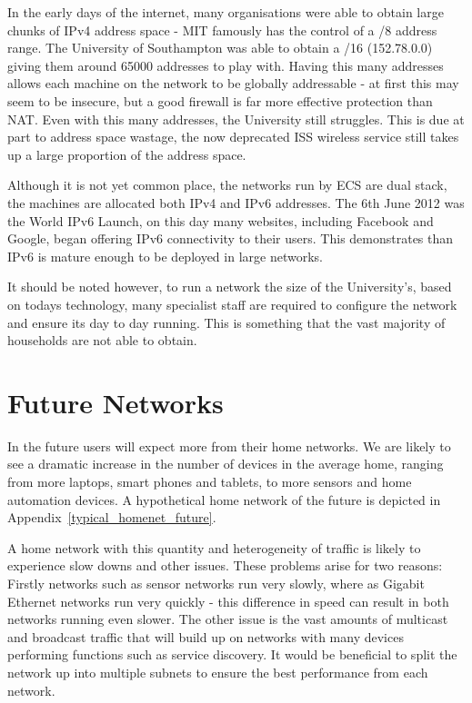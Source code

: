 \documentclass[12pt]{report}
\begin{document}
In the early days of the internet, many organisations were able to obtain large
chunks of IPv4 address space - MIT famously has the control of a /8 address
range. The University of Southampton was able to obtain a /16 (152.78.0.0)
giving them around 65000 addresses to play with. Having this many addresses
allows each machine on the network to be globally addressable - at first this
may seem to be insecure, but a good firewall is far more effective protection
than NAT\@. Even with this many addresses, the University still struggles. This
is due at part to address space wastage, the now deprecated ISS wireless
service still takes up a large proportion of the address space.

Although it is not yet common place, the networks run by ECS are dual stack,
the machines are allocated both IPv4 and IPv6 addresses. The 6th June 2012 was
the World IPv6 Launch, on this day many websites, including Facebook and
Google, began offering IPv6 connectivity to their users. This demonstrates than
IPv6 is mature enough to be deployed in large networks.

It should be noted however, to run a network the size of the University's,
based on todays technology, many specialist staff are required to configure the
network and ensure its day to day running. This is something that the vast
majority of households are not able to obtain.

\section{Future Networks}
In the future users will expect more from their home networks. We are likely to
see a dramatic increase in the number of devices in the average home, ranging
from more laptops, smart phones and tablets, to more sensors and home automation
devices. A hypothetical home network of the future is depicted in
Appendix~\ref{typical_homenet_future}.

A home network with this quantity and heterogeneity of traffic is likely to
experience slow downs and other issues. These problems arise for two reasons:
Firstly networks such as sensor networks run very slowly, where as Gigabit
Ethernet networks run very quickly - this difference in speed can result in
both networks running even slower. The other issue is the vast amounts of
multicast and broadcast traffic that will build up on networks with many
devices performing functions such as service discovery. It would be beneficial
to split the network up into multiple subnets to ensure the best performance
from each network. 
\end{document}
